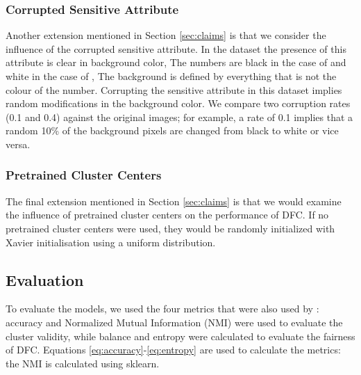 \subsubsection{Corrupted Sensitive Attribute}
Another extension mentioned in Section \ref{sec:claims} is that we consider the influence of the corrupted sensitive attribute. In the \revMNIST dataset the presence of this attribute is clear in background color, The numbers are black in the case of \USPSMNIST and white in the case of \revMNIST, The background is defined by everything that is not the colour of the number. Corrupting the sensitive attribute in this dataset implies random modifications in the background color. We compare two corruption rates (0.1 and 0.4) against the original images; for example, a rate of 0.1 implies that a random 10\% of the background pixels are changed from black to white or vice versa. 


\subsubsection{Pretrained Cluster Centers}
The final extension mentioned in Section \ref{sec:claims} is that we would examine the influence of pretrained cluster centers on the performance of DFC. If no pretrained cluster centers were used, they would be randomly initialized with Xavier initialisation using a uniform distribution.


\subsection{Evaluation}


To evaluate the models, we used the four metrics that were also used by \citet{Li_2020_CVPR}: accuracy and Normalized Mutual Information (NMI) were used to evaluate the cluster validity, while balance and entropy were calculated to evaluate the fairness of DFC. Equations \ref{eq:accuracy}-\ref{eq:entropy} are used to calculate the metrics: the NMI is calculated using sklearn.

